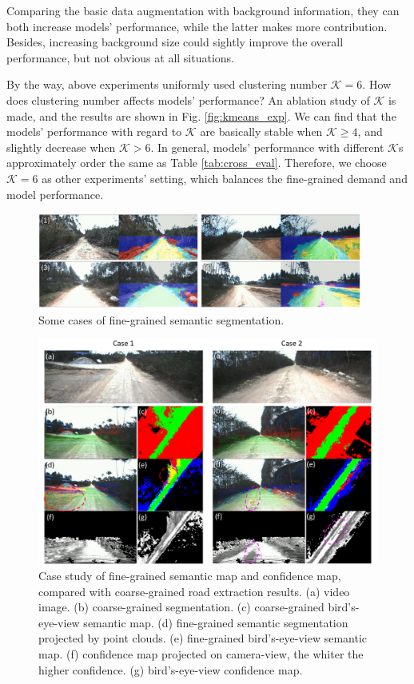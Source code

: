 \documentclass[letterpaper, 10 pt, conference]{ieeeconf}  %
\begin{document}
Comparing the basic data augmentation with background information, they can both increase models' performance, while the latter makes more contribution. Besides, increasing background size could sightly improve the overall performance, but not obvious at all situations.

By the way, above experiments uniformly used clustering number $\mathcal{K}=6$. How does clustering number affects models' performance? An ablation study of $\mathcal{K}$ is made, and the results are shown in Fig. \ref{fig:kmeans_exp}. We can find that the models' performance with regard to $\mathcal{K}$ are basically stable when $\mathcal{K} \geq 4$, and slightly decrease when $\mathcal{K}>6$. In general, models' performance with different $\mathcal{K}$s approximately order the same as Table \ref{tab:cross_eval}. Therefore, we choose $\mathcal{K}=6$ as other experiments' setting, which balances the fine-grained demand and model performance.

\begin{figure}[]
	\centering
	\includegraphics[width=0.95\textwidth]{semantic_segmentation.pdf}
	\caption{Some cases of fine-grained semantic segmentation.}
	\label{fig:semantic_segmentation}
\end{figure}

\begin{figure}[]
	\centering
	\includegraphics[width=\textwidth]{semantic_mapping.pdf}
	\caption{Case study of fine-grained semantic map and confidence map, compared with coarse-grained road extraction results. (a) video image. (b) coarse-grained segmentation. (c) coarse-grained bird's-eye-view semantic map. (d) fine-grained semantic segmentation projected by point clouds. (e) fine-grained bird's-eye-view semantic map. (f) confidence map projected on camera-view, the whiter the higher confidence. (g) bird's-eye-view confidence map.}
	\label{fig:semantic_mapping}
\end{figure}
\end{document}

